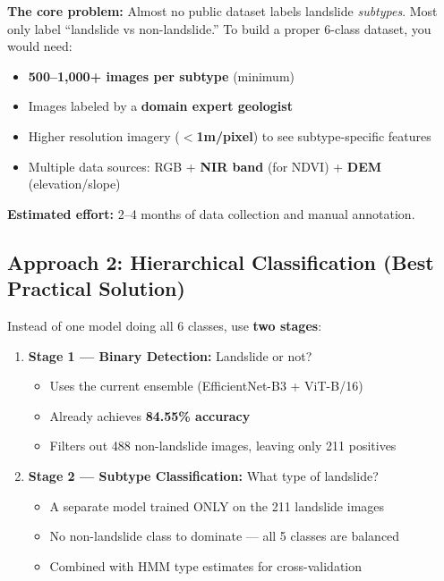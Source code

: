 \documentclass[12pt,a4paper]{article}
\begin{document}
\textbf{The core problem:} Almost no public dataset labels landslide \textit{subtypes}. Most only label ``landslide vs non-landslide.'' To build a proper 6-class dataset, you would need:

\begin{itemize}
    \item \textbf{500--1,000+ images per subtype} (minimum)
    \item Images labeled by a \textbf{domain expert geologist}
    \item Higher resolution imagery (\textbf{$<$1m/pixel}) to see subtype-specific features
    \item Multiple data sources: RGB + \textbf{NIR band} (for NDVI) + \textbf{DEM} (elevation/slope)
\end{itemize}

\textbf{Estimated effort:} 2--4 months of data collection and manual annotation.

\subsection{Approach 2: Hierarchical Classification (Best Practical Solution)}

Instead of one model doing all 6 classes, use \textbf{two stages}:

\begin{enumerate}
    \item \textbf{Stage 1 --- Binary Detection:} Landslide or not?
    \begin{itemize}
        \item Uses the current ensemble (EfficientNet-B3 + ViT-B/16)
        \item Already achieves \textbf{84.55\% accuracy}
        \item Filters out 488 non-landslide images, leaving only 211 positives
    \end{itemize}

    \item \textbf{Stage 2 --- Subtype Classification:} What type of landslide?
    \begin{itemize}
        \item A separate model trained ONLY on the 211 landslide images
        \item No non-landslide class to dominate --- all 5 classes are balanced
        \item Combined with HMM type estimates for cross-validation
    \end{itemize}
\end{enumerate}
\end{document}
